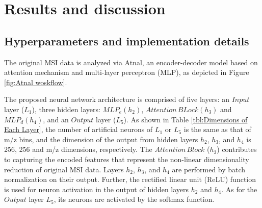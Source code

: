 \documentclass{WileyMSP-template}
\begin{document}
\section{Results and discussion}

\subsection{Hyperparameters and implementation details}
The original MSI data is analyzed via Atnal, an encoder-decoder model 
based on attention mechanism and multi-layer perceptron 
(MLP), as depicted in Figure \ref{fig:Atnal woskflow}. 




The proposed 
neural network architecture is comprised of five layers: an $Input$ 
layer ($L_1$), three hidden layers: $MLP_e (h_2)$, $Attention \, BLock (h_3)$ and 
$MLP_d (h_4)$,  
and an $Output$ layer ($L_5$). 
As shown in Table \ref{tbl:Dimensions of Each Layer}, 
the number of artificial neurons of $L_1$ or $L_5$ 
is the same as that of m/z  bins, and  the dimension of the output from 
hidden layers $h_2$, $h_3$, and $h_4$ 
is 256, 256 and m/z dimensions, respectively. 
The $Attention \, Block$ ($h_3$) contributes to capturing the encoded features that represent 
the non-linear dimensionality reduction 
of original MSI data. Layers $h_2$, $h_3$, and $h_4$ 
are performed by batch normalization on their output. Further, 
the rectified linear unit \cite{nair2010rectified} (ReLU) function is used for neuron activation 
in the output of hidden layers $h_2$ and $h_4$. As for the $Output$ layer $L_5$, its neurons
are activated by the softmax function. 
\end{document}
